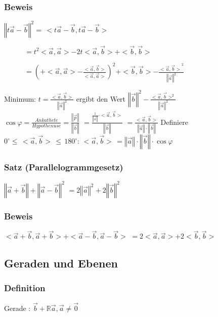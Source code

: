 \subsubsection{Beweis}
$\left\Vert t\vec{a} - \vec{b}\right\Vert^{2} = \, <t\vec{a} - \vec{b}, t\vec{a} - \vec{b}>$
\begin{description}
 \item [\tab] $ = t^{2}<\vec{a}, \vec{a}> - 2t<\vec{a}, \vec{b}> + <\vec{b}, \vec{b}>$
 \item [\tab] $ = \left(+ <\vec{a},\vec{a}> - \frac{<\vec{a}, \vec{b}>}{<\vec{a}, \vec{a}>}\right)^{2}
 + <\vec{b}, \vec{b}> - \frac{<{\vec{a}, \vec{b}>}^2}{\left\Vert\vec{a}\right\Vert^{2}}$
\end{description}
Minimum: $ t = \frac{<\vec{a}, \vec{b}>}{\left\Vert\vec{a}\right\Vert^2}$
ergibt den Wert $\left\Vert\vec{b}\right\Vert^2 - \frac{<\vec{a}, \vec{b}>^2}{\left\Vert\vec{a}\right\Vert^2}$\\
$\cos\varphi = \frac{Ankathete}{Hypothenuse} = \frac{\left\Vert\vec{p}\right\Vert}{\left\Vert\vec{b}\right\Vert}$
$= \frac{\frac{1}{\left\Vert\vec{a}\right\Vert}\cdot<\vec{a}, \vec{b}>}{\left\Vert\vec{b}\right\Vert}$
$= \frac{<\vec{a}, \vec{b}>}{\left\Vert\vec{a}\right\Vert\cdot\left\Vert\vec{b}\right\Vert}$
Definiere $0^{\circ}\leq\, <\vec{a}, \vec{b}>\, \leq\,  180^{\circ} :\, <\vec{a}, \vec{b}>\, = \left\Vert\vec{a}\right\Vert\cdot\left\Vert\vec{b}\right\Vert\cdot\cos\varphi$
%
%
%
\subsubsection{Satz (Parallelogrammgesetz)}
%
%
$\left\Vert\vec{a} + \vec{b}\right\Vert + \left\Vert\vec{a} - \vec{b}\right\Vert^{2}$
$= 2\left\Vert\vec{a}\right\Vert^2 + 2\left\Vert\vec{b}\right\Vert^2$
%
%
%
\subsubsection{Beweis}
$<\vec{a} + \vec{b}, \vec{a} + \vec{b}> + <\vec{a} -\vec{b}, \vec{a} - \vec{b}>$
$= 2<\vec{a}, \vec{a}> + 2<\vec{b}, \vec{b}>$
%
%
%
\subsection{Geraden und Ebenen}
\subsubsection{Definition}
Gerade : $\vec{b} + \mathbb{R}\vec{a}, \vec{a}\neq\vec{0}$